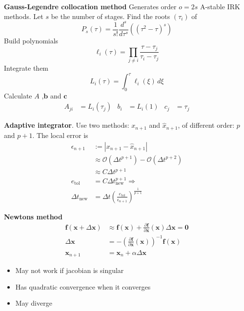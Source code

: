 \textbf{Gauss-Legendre collocation method}
Generates order \(o=2s\) A-stable IRK methods. Let \(s\) be the number of stages. Find the roots \((\tau_i)\) of 
\[P_s(\tau)=\frac{1}{s!}\frac{d^s}{d\tau^s}\left((\tau^2-\tau)^s\right)\]
Build polynomials
\[\ell_i(\tau) = \prod_{j\neq i}\frac{\tau-\tau_j}{\tau_i-\tau_j}\]
Integrate them
\[L_i(\tau) = \int_0^\tau\ell_i(\xi)\,d\xi\]
Calculate \(A\) ,\(\bm{b}\) and \(\bm{c}\)
\begin{align*}
    A_{ji} &= L_i(\tau_j) & b_i &= L_i(1) & c_j &=  \tau_j
\end{align*}

\textbf{Adaptive integrator}. 
Use two methods: \(x_{n+1}\) and \(\hat{x}_{n+1}\), of different order: \(p\) and \(p+1\). The local error is
\begin{align*}
    \epsilon_{n+1} &:= |x_{n+1}-\hat{x}_{n+1}| \\
    &\approx \mathcal{O}(\Delta t^{p+1})- \mathcal{O}(\Delta t^{p+2}) \\ 
    &\approx C\Delta t^{p+1} \\
    e_{\textrm{tol}} &=  C\Delta t^{p+1}_{\textrm{new}} \Rightarrow \\
    \Delta t_{\textrm{new}} &= \Delta t \left(\frac{e_{\textrm{tol}}}{\epsilon_{n+1}}\right)^{\frac{1}{p+1}}
\end{align*}

\textbf{Newtons method}
\begin{align*}
    \bm{f}(\bm{x}+\Delta \bm{x}) &\approx  \bm{f}(\bm{x}) + \frac{\partial \bm{f}}{\partial \bm{x}}(\bm{x})\Delta \bm{x}  = \bm{0} \\
    \Delta \bm{x} &= - \left(\frac{\partial \bm{f}}{\partial \bm{x}}(\bm{x})\right)^{-1}\bm{f}(\bm{x}) \\
    \bm{x}_{n+1} &= \bm{x}_n + \alpha \Delta \bm{x}
\end{align*}
\begin{itemize}
    \item May not work if jacobian is singular
    \item Has quadratic convergence when it converges
    \item May diverge
\end{itemize}
